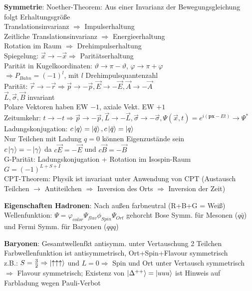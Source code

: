 \documentclass[10pt,twoside,a4paper]{article}
\begin{document}
\begin{multicols*}{3}
\textbf{Symmetrie}: Noether-Theorem: Aus einer Invarianz der Bewegungsgleichung folgt Erhaltungsgröße \\
Translationsinvarianz $\Rightarrow$ Impulserhaltung \\
Zeitliche Translationsinvarianz $\Rightarrow$ Energieerhaltung \\
Rotation im Raum $\Rightarrow$ Drehimpulserhaltung \\
Spiegelung: $\vec{x} \to - \vec{x} \Rightarrow$ Paritätserhaltung \\
Parität in Kugelkoordinaten: $\vartheta \to \pi - \vartheta$, $\varphi \to \pi + \varphi$ \\
$\Rightarrow P_{Bahn} = (-1)^l$, mit $l$ Drehimpulsquantenzahl \\ 
Parität: $\vec{r} \to - \vec{r} \Rightarrow \vec{p} \to - \vec{p}, \vec{E} \to - \vec{E}, \vec{A} \to - \vec{A}$ \\ $\vec{L}, \vec{\sigma}, \vec{B}$ invariant \\
Polare Vektoren haben EW $-1$, axiale Vekt. EW $+1$ \\
Zeitumkehr: $t \to -t \Rightarrow \vec{p} \to -\vec{p}, \vec{L} \to - \vec{L}, \vec{\sigma} \to - \vec{\sigma}, \Psi (\vec{x},t) = e^{i(\textbf{px} - E t)} \to \Psi^*$ \\
Ladungskonjugation: $c \ket{q} = \ket{\bar{q}}, c \ket{\bar{q}} = \ket{q}$ \\
Nur Teilchen mit Ladung $q = 0$ können Eigenzustände sein \\
$c \ket{\gamma} = - \ket{\gamma}$ da $c \vec{E} = - \vec{E}$ und $c \vec{B} = - \vec{B}$ \\
G-Parität: Ladungskonjugation + Rotation im Isospin-Raum \\
$G = (-1)^{L+S+I}$ \\
CPT-Theorem: Physik ist invariant unter Anwendung von CPT (Austausch Teilchen $\to$ Antiteilchen $\Rightarrow$ Inversion des Orts $\Rightarrow$ Inversion der Zeit)

\textbf{Eigenschaften Hadronen}: Nach außen farbneutral (R+B+G = Weiß) \\
Wellenfunktion: $\Psi = \varphi_{color} \Psi_{flav} \phi_{Spin} \Psi_{Ort}$ gehorcht Bose Symm. für Mesonen ($q\bar{q}$) und Fermi Symm. für Baryonen ($qqq$)

\textbf{Baryonen}: Gesamtwellenfkt antisymm. unter Vertauschung 2 Teilchen \\
Farbwellenfunktion ist antisymmetrisch, Ort+Spin+Flavour symmetrisch \\
z.B.: $S = \frac{3}{2} \Rightarrow \ket{\uparrow \uparrow \uparrow}$ und $L = 0 \Rightarrow$ Spin und Ort unter Vertausch symmetrisch $\Rightarrow$ Flavour symmetrisch; Existenz von $\ket{\Delta^{++}} = \ket{uuu}$ ist Hinweis auf Farbladung wegen Pauli-Verbot


\end{multicols*}
\end{document}
